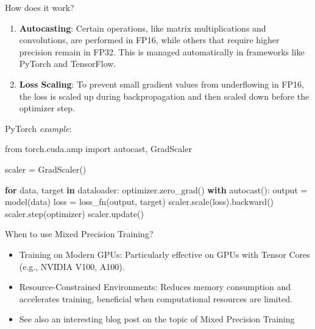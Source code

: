 \documentclass[
  9pt,
  ignorenonframetext,
  aspectratio=169,
]{beamer}
\newenvironment{Shaded}{\begin{snugshade}}{\end{snugshade}}
\newcommand{\ControlFlowTok}[1]{\textcolor[rgb]{0.00,0.23,0.31}{\textbf{#1}}}
\newcommand{\ImportTok}[1]{\textcolor[rgb]{0.00,0.46,0.62}{#1}}
\newcommand{\KeywordTok}[1]{\textcolor[rgb]{0.00,0.23,0.31}{\textbf{#1}}}
\newcommand{\NormalTok}[1]{\textcolor[rgb]{0.00,0.23,0.31}{#1}}
\newcommand{\OperatorTok}[1]{\textcolor[rgb]{0.37,0.37,0.37}{#1}}
\begin{document}
\begin{frame}[fragile]{How does it work?}
\label{how-does-it-work}
\begin{enumerate}
\item
  \textbf{Autocasting}: Certain operations, like matrix multiplications
  and convolutions, are performed in FP16, while others that require
  higher precision remain in FP32. This is managed automatically in
  frameworks like PyTorch and TensorFlow.
\item
  \textbf{Loss Scaling}: To prevent small gradient values from
  underflowing in FP16, the loss is scaled up during backpropagation and
  then scaled down before the optimizer step.
\end{enumerate}

PyTorch \emph{example}:

\begin{Shaded}
\begin{Highlighting}[]
\ImportTok{from}\NormalTok{ torch.cuda.amp }\ImportTok{import}\NormalTok{ autocast, GradScaler}

\NormalTok{scaler }\OperatorTok{=}\NormalTok{ GradScaler()}

\ControlFlowTok{for}\NormalTok{ data, target }\KeywordTok{in}\NormalTok{ dataloader:}
\NormalTok{    optimizer.zero\_grad()}
    \ControlFlowTok{with}\NormalTok{ autocast():}
\NormalTok{        output }\OperatorTok{=}\NormalTok{ model(data)}
\NormalTok{        loss }\OperatorTok{=}\NormalTok{ loss\_fn(output, target)}
\NormalTok{    scaler.scale(loss).backward()}
\NormalTok{    scaler.step(optimizer)}
\NormalTok{    scaler.update()}
\end{Highlighting}
\end{Shaded}
\end{frame}

\begin{frame}{When to use Mixed Precision Training?}
\label{when-to-use-mixed-precision-training}
\begin{itemize}
\item
  Training on Modern GPUs: Particularly effective on GPUs with Tensor
  Cores (e.g., NVIDIA V100, A100).
\item
  Resource-Constrained Environments: Reduces memory consumption and
  accelerates training, beneficial when computational resources are
  limited.
\item
  See also an interesting blog post on the topic of Mixed Precision
  Training
  \href{https://blog.paperspace.com/mixed-precision-training-benchmark/}{\faFilePdf}
\end{itemize}
\end{frame}
\end{document}
